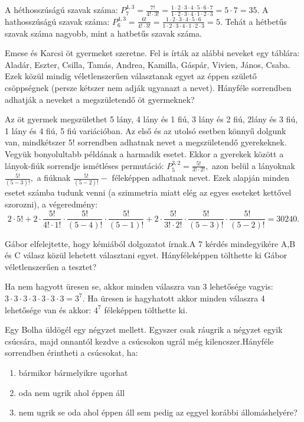 \begin{solution}
A héthosszúságú szavak száma: $P_{7}^{4,3}=\frac{7!}{4!\cdot3!}=\frac{1\cdot2\cdot3\cdot4\cdot5\cdot6\cdot7}{1\cdot2\cdot3\cdot4\cdot1\cdot2\cdot3}=5\cdot7=35.$
A hathosszúságú szavak száma: $P_{6}^{4,3}=\frac{6!}{4!\cdot3!}=\frac{1\cdot2\cdot3\cdot4\cdot5\cdot6}{1\cdot2\cdot3\cdot4\cdot1\cdot2\cdot3}=5.$
Tehát a hétbetűs szavak száma nagyobb, mint a hatbetűs szavak száma. 
\end{solution}
\begin{problem}
Emese és Karcsi öt gyermeket szeretne. Fel is írták az alábbi neveket
egy táblára: Aladár, Eszter, Csilla, Tamás, Andrea, Kamilla, Gáspár,
Vivien, János, Csaba. Ezek közül mindig véletlenszerűen választanak
egyet az éppen születő csöppségnek (persze kétszer nem adják ugyanazt
a nevet). Hányféle sorrendben adhatják a neveket a megszületendő öt
gyermeknek? 
\end{problem}

\begin{solution}
Az öt gyermek megszülethet 5 lány, 4 lány és 1 fiú, 3 lány és 2 fiú,
2lány és 3 fiú, 1 lány és 4 fiú, 5 fiú variációban. Az első és az
utolsó esetben könnyű dolgunk van, mindkétszer $5!$ sorrendben adhatnak
nevet a megszületendő gyerekeknek. Vegyük bonyolultabb példának a
harmadik esetet. Ekkor a gyerekek között a lányok-fiúk sorrendje ismétléses
permutáció: $P_{5}^{3,2}=\frac{5!}{3!\cdot2!},$ azon belül a lányoknak
$\frac{5!}{(5-3)!},$ a fiúknak $\frac{5!}{(5-2)!}-$ féleképpen adhatnak
nevet. Ezek alapján minden esetet számba tudunk venni (a szimmetria
miatt elég az egyes eseteket kettővel szorozni), a végeredmény:
\[
2\cdot5!+2\cdot\frac{5!}{4!\cdot1!}\cdot\frac{5!}{(5-4)!}\cdot\frac{5!}{(5-1)!}+2\cdot\frac{5!}{3!\cdot2!}\cdot\frac{5!}{(5-3)!}\cdot\frac{5!}{(5-2)!}=30240.
\]
\end{solution}
\begin{problem}
Gábor elfelejtette, hogy kémiából dolgozatot írnak.A 7 kérdés mindegyikére
A,B és C válasz közül lehetett választani egyet. Hányféleképpen tölthette
ki Gábor véletlenszerűen a tesztet?
\end{problem}

\begin{solution}
Ha nem hagyott üresen se, akkor minden válaszra van 3 lehetősége vagyis: $3\cdot3\cdot3\cdot3\cdot3\cdot3\cdot3=3^{7}.$ Ha üresen is hagyhatott
akkor minden válaszra 4 lehetősége van és akkor: $4^{7}$ féleképpen
tölthette ki. 
\end{solution}
\begin{problem}
Egy Bolha üldögél egy négyzet mellett. Egyszer csak ráugrik a négyzet
egyik csúcsára, majd onnantól kezdve a csúcsokon ugrál még kilencszer.Hányféle
sorrendben érintheti a csúcsokat, ha:
\begin{enumerate}
\item bármikor bármelyikre ugorhat 
\item oda nem ugrik ahol éppen áll 
\item nem ugrik se oda ahol éppen áll sem pedig az eggyel korábbi állomáshelyére? 
\end{enumerate}

\end{problem}

